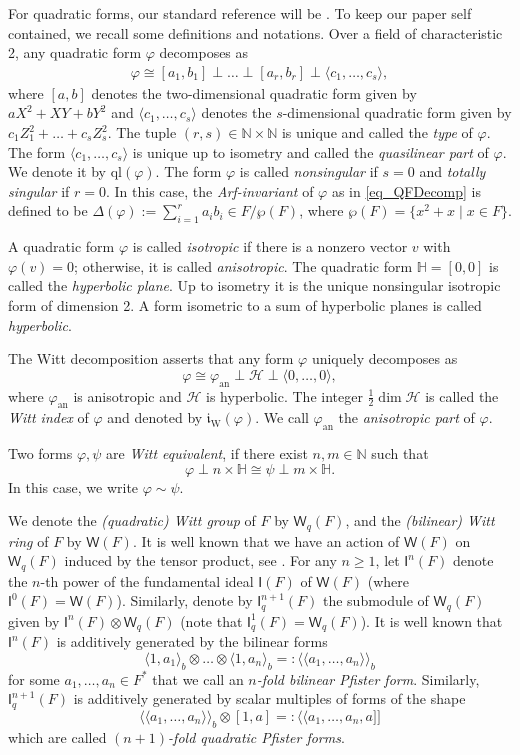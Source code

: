 \documentclass{amsart}
\numberwithin{equation}{section}
\newcommand{\N}{\mathbb{N}}
\newcommand{\qf}[1]{\langle #1\rangle}
\newcommand{\iw}[1]{\mathfrak{i}_{\mathrm{W}}(#1)} %
\newcommand{\an}{\mathrm{an}} %
\newcommand{\ql}[1]{\mathrm{ql}\left(#1\right)}
\newcommand{\qpf}[1]{\langle\!\langle #1]\!]}
\newcommand{\bif}[1]{\langle #1 \rangle_b}
\newcommand{\bipf}[1]{\langle\!\langle #1\rangle\!\rangle_b}
\renewcommand{\H}{\mathbb{H}}
\newcommand{\I}{\mathsf{I}}
\newcommand{\W}{\mathsf{W}}
\begin{document}
For quadratic forms, our standard reference will be \cite{ElmanKarpenkoMerkurjev2008}.
To keep our paper self contained, we recall some definitions and notations.
Over a field of characteristic 2, any quadratic form $\varphi$ decomposes as
\begin{align} \label{eq_QFDecomp}
	\varphi \cong [a_1, b_1] \perp \ldots \perp [a_r, b_r] \perp \qf{c_1, \ldots, c_s},
\end{align}
where $[a, b]$ denotes the two-dimensional quadratic form given by $aX^2 + XY + bY^2$ and $\qf{c_1, \ldots, c_s}$ denotes the $s$-dimensional quadratic form given by $c_1Z_1^2 + \ldots + c_sZ_s^2$.
The tuple $(r, s) \in \N \times \N$ is unique and called the \emph{type} of $\varphi$.
The form $\qf{c_1, \ldots, c_s}$ is unique up to isometry and called the \emph{quasilinear part} of $\varphi$.
We denote it by $\ql{\varphi}$.
The form $\varphi$ is called \emph{nonsingular} if $s = 0$ and \emph{totally singular} if $r = 0$.
In this case, the \emph{Arf-invariant} of $\varphi$ as in \eqref{eq_QFDecomp} is defined to be $\Delta(\varphi) := \sum_{i = 1}^r a_ib_i \in F/ \wp(F)$, where $\wp(F) = \{x^2 + x \mid x \in F\}$.

A quadratic form $\varphi$ is called \emph{isotropic} if there is a nonzero vector $v$ with $\varphi(v) = 0$; otherwise, it is called \emph{anisotropic}.
The quadratic form $\H = [0, 0]$ is called the \emph{hyperbolic plane}. 
Up to isometry it is the unique nonsingular isotropic form of dimension 2.
A form isometric to a sum of hyperbolic planes is called \emph{hyperbolic}.

The Witt decomposition asserts that any form $\varphi$ uniquely decomposes as
\[\varphi \cong \varphi_\an \perp \mathcal H \perp \qf{0, \ldots, 0}, \]
where $\varphi_\an$ is anisotropic and $\mathcal H$ is hyperbolic.
The integer $\frac12 \dim \mathcal H$ is called the \emph{Witt index} of $\varphi$ and denoted by $\iw\varphi$.
We call $\varphi_\an$ the \emph{anisotropic part} of $\varphi$.

Two forms $\varphi, \psi$ are \emph{Witt equivalent}, if there exist $n, m \in \N$ such that 
\[\varphi \perp n \times \H \cong \psi \perp m \times \H.\]
In this case, we write $\varphi \sim \psi$.

We denote the \emph{(quadratic) Witt group} of $F$ by $\W_q(F)$, and the \emph{(bilinear) Witt ring} of $F$ by $\W(F)$.
It is well known that we have an action of $\W(F)$ on $\W_q(F)$ induced by the tensor product, see \cite[Section 8.B]{ElmanKarpenkoMerkurjev2008}.
For any $n \geq 1$, let $\I^n(F)$ denote the $n$-th power of the fundamental ideal $\I(F)$ of $\W(F)$ (where $\I^0(F) = \W(F)$).
Similarly, denote by $\I^{n+1}_q(F)$ the submodule of $\W_q(F)$ given by $\I^n(F) \otimes \W_q(F)$ (note that $\I^1_q(F) = \W_q(F)$).
It is well known that $\I^n(F)$ is additively generated by the bilinear forms
\[\bif{1, a_1} \otimes \ldots \otimes \bif{1, a_n} =: \bipf{a_1, \ldots, a_n}\]
for some $a_1, \ldots, a_n \in F^\ast$ that we call an \emph{$n$-fold bilinear Pfister form}.
Similarly, $\I^{n+1}_q(F)$ is additively generated by scalar multiples of forms of the shape
\[\bipf{a_1, \ldots, a_n} \otimes [1, a] =: \qpf{a_1, \ldots, a_n, a}\]
which are called \emph{$(n+1)$-fold quadratic Pfister forms}.
\end{document}
